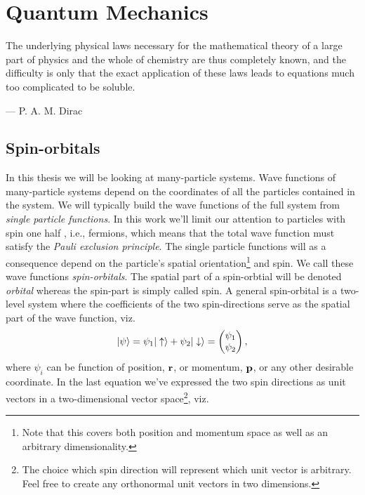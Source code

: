 \chapter{Quantum Mechanics}
    \epigraph{The underlying physical laws necessary for the mathematical
    theory of a large part of physics and the whole of chemistry are thus
    completely known, and the difficulty is only that the exact application of
    these laws leads to equations much too complicated to be soluble.}
    {--- P. A. M. Dirac}

    \section{Spin-orbitals}
        In this thesis we will be looking at many-particle systems. Wave
        functions of many-particle systems depend on the coordinates of all the
        particles contained in the system. We will typically build the wave
        functions of the full system from \emph{single particle functions}. In
        this work we'll limit our attention to particles with spin one half ,
        i.e., fermions, which means that the total wave function must satisfy
        the \emph{Pauli exclusion principle}. The single particle functions
        will as a consequence depend on the particle's spatial
        orientation\footnote{Note that this covers both position and momentum
        space as well as an arbitrary dimensionality.} and spin. We call
        these wave functions \emph{spin-orbitals}. The spatial part of a
        spin-orbtial will be denoted \emph{orbital} whereas the spin-part is
        simply called spin. A general spin-orbital is a two-level system where
        the coefficients of the two spin-directions serve as the spatial part of
        the wave function, viz.
        \begin{align}
            | \psi \rangle = \psi_1| \uparrow \rangle + \psi_2| \downarrow \rangle
            =
            \begin{pmatrix}
                \psi_1 \\
                \psi_2
            \end{pmatrix},
            \label{eq:general-spin-orbital}
        \end{align}
        where $\psi_i$ can be function of position, $\mathbf{r}$, or momentum,
        $\mathbf{p}$, or any other desirable coordinate.  In the last equation we've
        expressed the two spin directions as unit vectors in a two-dimensional
        vector space\footnote{The choice which spin direction will represent
        which unit vector is arbitrary. Feel free to create any orthonormal unit
        vectors in two dimensions.}, viz.
